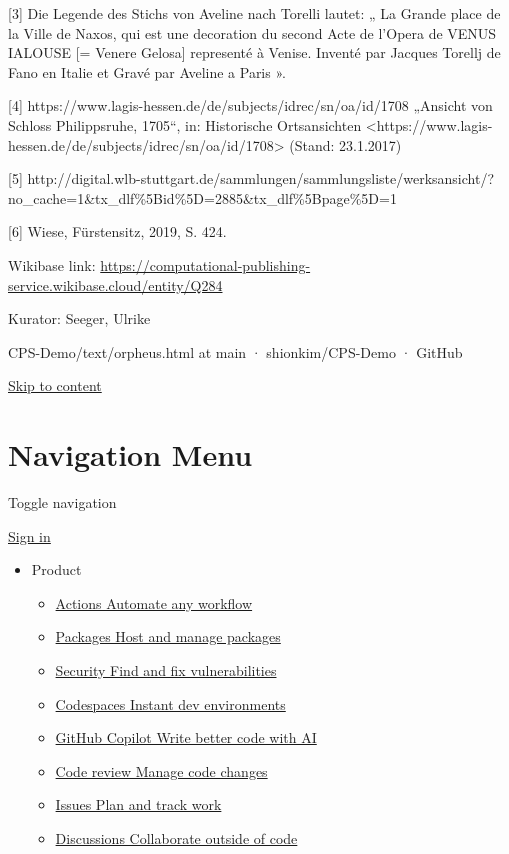 \documentclass[
  letterpaper,
]{book}
\providecommand{\tightlist}{%
  \setlength{\itemsep}{0pt}\setlength{\parskip}{0pt}}\usepackage{longtable,booktabs,array}
\begin{document}
{[}3{]} Die Legende des Stichs von Aveline nach Torelli lautet: „ La
Grande place de la Ville de Naxos, qui est une decoration du second Acte
de l'Opera de VENUS IALOUSE {[}= Venere Gelosa{]} representé à Venise.
Inventé par Jacques Torellj de Fano en Italie et Gravé par Aveline a
Paris ».

{[}4{]} https://www.lagis-hessen.de/de/subjects/idrec/sn/oa/id/1708
„Ansicht von Schloss Philippsruhe, 1705``, in: Historische Ortsansichten
\textless https://www.lagis-hessen.de/de/subjects/idrec/sn/oa/id/1708\textgreater{}
(Stand: 23.1.2017)

{[}5{]}
http://digital.wlb-stuttgart.de/sammlungen/sammlungsliste/werksansicht/?no\_cache=1\&tx\_dlf\%5Bid\%5D=2885\&tx\_dlf\%5Bpage\%5D=1

{[}6{]} Wiese, Fürstensitz, 2019, S. 424.

Wikibase link:
\url{https://computational-publishing-service.wikibase.cloud/entity/Q284}

Kurator: Seeger, Ulrike

CPS-Demo/text/orpheus.html at main · shionkim/CPS-Demo · GitHub

\hyperref[start-of-content]{Skip to content}

\section{Navigation Menu}\label{navigation-menu}

Toggle navigation

\href{./login?return_to=https\%3A\%2F\%2Fgithub.com\%2Fshionkim\%2FCPS-Demo\%2Fblob\%2Fmain\%2Ftext\%2Forpheus.html}{Sign
in}

\begin{itemize}
\item
  Product

  \begin{itemize}
  \tightlist
  \item
    \href{https://github.com/features/actions}{Actions Automate any
    workflow}
  \item
    \href{https://github.com/features/packages}{Packages Host and manage
    packages}
  \item
    \href{https://github.com/features/security}{Security Find and fix
    vulnerabilities}
  \item
    \href{https://github.com/features/codespaces}{Codespaces Instant dev
    environments}
  \item
    \href{https://github.com/features/copilot}{GitHub Copilot Write
    better code with AI}
  \item
    \href{https://github.com/features/code-review}{Code review Manage
    code changes}
  \item
    \href{https://github.com/features/issues}{Issues Plan and track
    work}
  \item
    \href{https://github.com/features/discussions}{Discussions
    Collaborate outside of code}
  \end{itemize}
\end{itemize}
\end{document}
